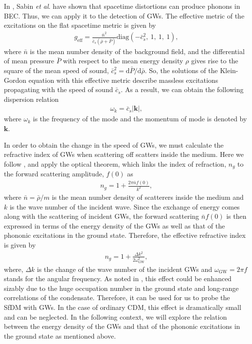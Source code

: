 \documentclass[aps,prd,twocolumn,10pt,groupedaddress]{revtex4-1}
\begin{document}
In \cite{Sabin:2014bua}, Sabin \textit{et al}. have shown that spacetime distortions can produce phonons in BEC. Thus, we can apply it to the detection of GWs. The effective metric of the excitations on the flat spacetime metric is given by
\begin{align}
g_{\mathrm{eff}}=\frac{\bar{n}^{2}}{\bar{c}_{s}(\bar{\rho}+\bar{P})}\mathrm{diag}(-\bar{c}_{s}^{2},\ 1,\ 1,\ 1),
\end{align}
where $\bar{n}$ is the mean number density of the background field, and the differential of mean pressure $\bar{P}$ with respect to the mean energy density $\rho$ gives rise to the square of the mean speed of sound, $\bar{c}_s^2=\mathrm{d}\bar{P}/\mathrm{d}\bar{\rho}$. So, the solutions of the Klein-Gordon equation with this effective metric describe massless excitations propagating with the speed of sound $\bar{c}_{s}$. As a result, we can obtain the following dispersion relation
\begin{align}
\omega_{k}=\bar{c}_{s}|\mathbf{k}|,
\end{align}
where $\omega_{k}$ is the frequency of the mode and the momentum of mode is denoted by $\mathbf{k}$.

In order to obtain the change in the speed of GWs, we must calculate the refractive index of GWs when scattering off scatters inside the medium. Here we follow \cite{Dev:2016hxv}, and apply the optical theorem, which links the index of refraction, $n_{g}$ to the forward scattering amplitude, $f(0)$ as
\begin{align}
n_{g}=1+\frac{2\pi \bar{n}f(0)}{k^{2}},
\end{align}
where $\bar{n}=\bar{\rho}/m$ is the mean number density of scatterers inside the medium and $k$ is the wave number of the incident wave. Since the exchange of energy comes along with the scattering of incident GWs, the forward scattering $\bar{n}f(0)$ is then expressed in terms of  the energy density of the GWs as well as that of the phononic excitations in the ground state. Therefore, the effective refractive index is given by
\begin{align}
n_{g}=1+\frac{\Delta k^{2}}{2\omega_\mathrm{GW}^{2}},
\end{align}
where, $\Delta k$ is the change of the wave number of the incident GWs and $\omega_\mathrm{GW}=2\pi f$ stands for the angular frequency. As noted in \cite{Dev:2016hxv}, this effect could be enhanced sizably due to the huge occupation number in the ground state and long-range correlations of the condensate. Therefore, it can be used for us to probe the SfDM with GWs. In the case of ordinary CDM, this effect is dramatically small and can be neglected. In the following context, we will explore the relation between the energy density of the GWs and that of the phononic excitations in the ground state as mentioned above.
\end{document}

